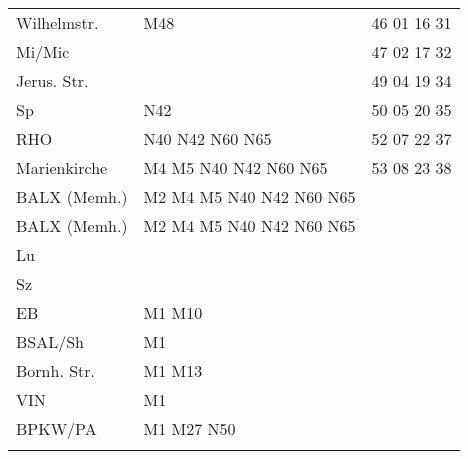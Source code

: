 \begin{tabular}{!{\color{schiefergrau}\vrule width 3pt}*{3}{l!{\color{schiefergrau}\vrule width 3pt}}}
Wilhelmstr.  & \mbus{} M48                                                           & 46 01 16 31 \\
Mi/Mic       & \nusechs{}                                                            & 47 02 17 32 \\
Jerus. Str.  &                                                                       & 49 04 19 34 \\
Sp           & \nbus{} N42                                                           & 50 05 20 35 \\
RHO          & \nuacht{} \nbus{} N40 N42 N60 N65                                     & 52 07 22 37 \\
Marienkirche & \nufuenf{} \nuacht{} \mtram{} M4 M5 \nbus{} N40 N42 N60 N65           & 53 08 23 38 \\
BALX (Memh.) & \nufuenf{} \nuacht{} \mtram{} M2 M4 M5 \nbus{} N40 N42 N60 N65        & \\
\hline
BALX (Memh.) & \nufuenf{} \nuacht{} \mtram{} M2 M4 M5 \nbus{} N40 N42 N60 N65        & \\
Lu           &                                                                       & \\
Sz           &                                                                       & \\
EB           & \mtram{} M1 M10                                                       & \\
BSAL/Sh      & \mtram{} M1                                                           & \\
Bornh. Str.  & \mtram{} M1 M13                                                       & \\
VIN          & \mtram{} M1                                                           & \\
BPKW/PA      & \mtram{} M1 \mbus{} M27 \nbus{} N50                                   & \\
\myhline
\end{tabular}
